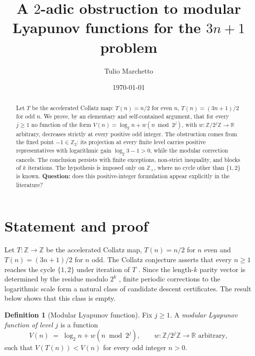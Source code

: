 \documentclass[10pt]{amsart}
\theoremstyle{definition}
\newtheorem{definition}[theorem]{Definition}
\theoremstyle{remark}
\newcommand{\Z}{\mathbb{Z}}
\newcommand{\R}{\mathbb{R}}
\begin{document}
\title[A $2$-adic obstruction to modular Lyapunov functions]{A $2$-adic obstruction to modular Lyapunov functions for the $3n+1$ problem}

\author{Tulio Marchetto}

\date{\today}

\begin{abstract}
Let $T$ be the accelerated Collatz map: $T(n)=n/2$ for even $n$, $T(n)=(3n+1)/2$ for odd $n$. We prove, by an elementary and self-contained argument, that for every $j\ge 1$ no function of the form $V(n)=\log_2 n+w(n\bmod 2^j)$, with $w:\Z/2^j\Z\to\R$ arbitrary, decreases strictly at every positive odd integer. The obstruction comes from the fixed point $-1\in\Z_2$: its projection at every finite level carries positive representatives with logarithmic gain $\log_2 3-1>0$, while the modular correction cancels. The conclusion persists with finite exceptions, non-strict inequality, and blocks of $k$ iterations. The hypothesis is imposed only on $\Z_+$, where no cycle other than $\{1,2\}$ is known. \textbf{Question:} does this positive-integer formulation appear explicitly in the literature?
\end{abstract}

\maketitle

\section{Statement and proof}

Let $T:\Z\to\Z$ be the accelerated Collatz map, $T(n)=n/2$ for $n$ even and $T(n)=(3n+1)/2$ for $n$ odd. The Collatz conjecture asserts that every $n\ge 1$ reaches the cycle $\{1,2\}$ under iteration of $T$ \cite{lagarias1985,lagarias2010}. Since the length-$k$ parity vector is determined by the residue modulo $2^k$ \cite{terras1976}, finite periodic corrections to the logarithmic scale form a natural class of candidate descent certificates. The result below shows that this class is empty.

\begin{definition}[Modular Lyapunov function]\label{def:lyap}
Fix $j \ge 1$. A \emph{modular Lyapunov function of level $j$} is a function
\[
V(n) \;=\; \log_2 n + w(n \bmod 2^j), \qquad w : \Z/2^j\Z \to \R \text{ arbitrary},
\]
such that $V(T(n)) < V(n)$ for every odd integer $n > 0$.
\end{definition}
\end{document}
